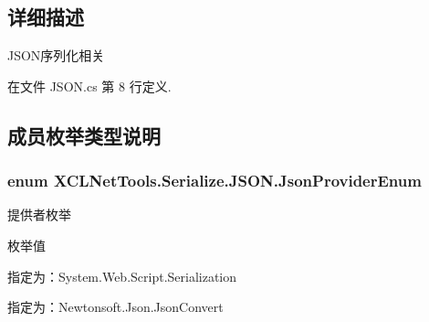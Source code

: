 \subsection{详细描述}
J\-S\-O\-N序列化相关 



在文件 J\-S\-O\-N.\-cs 第 8 行定义.



\subsection{成员枚举类型说明}
\hypertarget{class_x_c_l_net_tools_1_1_serialize_1_1_j_s_o_n_acb00f7258e4dedfaa0cec15ce9335a31}{
\subsubsection[{Json\-Provider\-Enum}]{\setlength{\rightskip}{0pt plus 5cm}enum {\bf X\-C\-L\-Net\-Tools.\-Serialize.\-J\-S\-O\-N.\-Json\-Provider\-Enum}}}\label{class_x_c_l_net_tools_1_1_serialize_1_1_j_s_o_n_acb00f7258e4dedfaa0cec15ce9335a31}


提供者枚举 

\begin{Desc}
\item[枚举值]\par
\begin{description}
\item[{\em 
\hypertarget{class_x_c_l_net_tools_1_1_serialize_1_1_j_s_o_n_acb00f7258e4dedfaa0cec15ce9335a31a67a1b1b70420ea0e3be332a9dedcb83e}{System\-Web}\label{class_x_c_l_net_tools_1_1_serialize_1_1_j_s_o_n_acb00f7258e4dedfaa0cec15ce9335a31a67a1b1b70420ea0e3be332a9dedcb83e}
}]指定为：\-System.\-Web.\-Script.\-Serialization \item[{\em 
\hypertarget{class_x_c_l_net_tools_1_1_serialize_1_1_j_s_o_n_acb00f7258e4dedfaa0cec15ce9335a31a3dae1400047ce0f8033b4d8f2815fc92}{Newtonsoft}\label{class_x_c_l_net_tools_1_1_serialize_1_1_j_s_o_n_acb00f7258e4dedfaa0cec15ce9335a31a3dae1400047ce0f8033b4d8f2815fc92}
}]指定为：\-Newtonsoft.\-Json.\-Json\-Convert \end{description}
\end{Desc}


